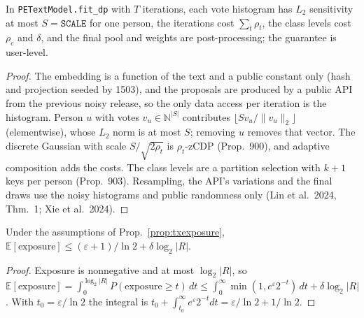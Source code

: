 \begin{proposition}\label{prop:txpe}
In \texttt{PETextModel.fit\_dp} with $T$ iterations, each vote histogram has $L_2$ sensitivity at most
$S=\texttt{SCALE}$ for one person, the iterations cost $\sum_t\rho_t$, the class levels cost $\rho_c$ and $\delta$, and
the final pool and weights are post-processing; the guarantee is user-level.
\end{proposition}
\begin{proof}
The embedding is a function of the text and a public constant only (hash and projection seeded by 1503), and the
proposals are produced by a public API from the previous noisy release, so the only data access per iteration is the
histogram. Person $u$ with votes $v_u\in\mathbb N^{|S|}$ contributes $\lfloor Sv_u/\|v_u\|_2\rfloor$ (elementwise), whose
$L_2$ norm is at most $S$; removing $u$ removes that vector. The discrete Gaussian with scale
$S/\sqrt{2\rho_t}$ is $\rho_t$-zCDP (Prop.~900), and adaptive composition adds the costs. The class levels are a
partition selection with $k+1$ keys per person (Prop.~903). Resampling, the API's variations and the final draws use
the noisy histograms and public randomness only (Lin et al.\ 2024, Thm.~1; Xie et al.\ 2024).
\end{proof}

\begin{proposition}\label{prop:txexpect}
Under the assumptions of Prop.~\ref{prop:txexposure},
$\mathbb E[\mathrm{exposure}]\le(\varepsilon+1)/\ln2+\delta\log_2|R|$.
\end{proposition}
\begin{proof}
Exposure is nonnegative and at most $\log_2|R|$, so $\mathbb E[\mathrm{exposure}]=\int_0^{\log_2|R|}P(\mathrm{exposure}
\ge t)\,dt\le\int_0^{\infty}\min(1,e^\varepsilon2^{-t})\,dt+\delta\log_2|R|$. With $t_0=\varepsilon/\ln2$ the integral is
$t_0+\int_{t_0}^\infty e^\varepsilon2^{-t}dt=\varepsilon/\ln2+1/\ln2$.
\end{proof}

